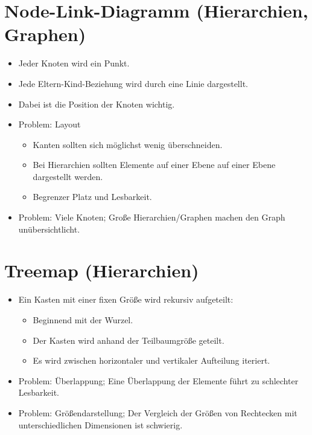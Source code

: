 \documentclass[a4paper, 11pt, accentcolor = tud3b]{tudreport}
\begin{document}
		\section{Node-Link-Diagramm (Hierarchien, Graphen)}
			\begin{itemize}
				\item Jeder Knoten wird ein Punkt.
				\item Jede Eltern-Kind-Beziehung wird durch eine Linie dargestellt.
				\item Dabei ist die Position der Knoten wichtig.
				\item Problem: Layout
					\begin{itemize}
						\item Kanten sollten sich möglichst wenig überschneiden.
						\item Bei Hierarchien sollten Elemente auf einer Ebene auf einer Ebene dargestellt werden.
						\item Begrenzer Platz und Lesbarkeit.
					\end{itemize}
				\item Problem: Viele Knoten; Große Hierarchien/Graphen machen den Graph unübersichtlicht.
			\end{itemize}

		\section{Treemap (Hierarchien)}
			\begin{itemize}
				\item Ein Kasten mit einer fixen Größe wird rekursiv aufgeteilt:
					\begin{itemize}
						\item Beginnend mit der Wurzel.
						\item Der Kasten wird anhand der Teilbaumgröße geteilt.
						\item Es wird zwischen horizontaler und vertikaler Aufteilung iteriert.
					\end{itemize}
				\item Problem: Überlappung; Eine Überlappung der Elemente führt zu schlechter Lesbarkeit.
				\item Problem: Größendarstellung; Der Vergleich der Größen von Rechtecken mit unterschiedlichen Dimensionen ist schwierig.
			\end{itemize}
\end{document}
